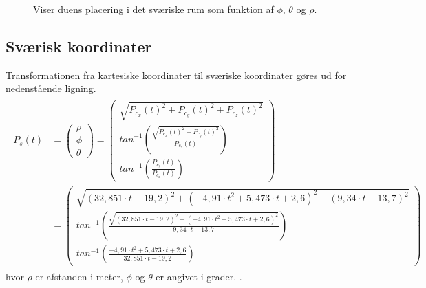 \begin{figure}[!th]
\centering
\begin{tikzpicture}[scale=4]

\end{tikzpicture}
\caption[Sværisk koordinatsystem til koordinattransformation]{Viser duens placering i det sværiske rum som funktion af  \(\phi\), \(\theta\) og \(\rho\).}
\label{fig:thetaphi_degree}
\end{figure}


\subsection{Sværisk koordinater}
Transformationen fra kartesiske koordinater til sværiske koordinater gøres ud for nedenstående ligning.
\begin{align}
\begin{split}
{ P }_{ s }\left( t \right) &=\left( \begin{matrix} \rho  \\ \phi  \\ \theta  \end{matrix} \right) =\left( \begin{matrix} \sqrt { { { P }_{ c_x }\left( t \right) }^{ 2 }+{ { P }_{ c_y }\left( t \right) }^{ 2 }+{ { P }_{ c_z }\left( t \right) }^{ 2 } }  \\ { tan }^{ -1 }\left( \frac { \sqrt { { { P }_{ c_x }\left( t \right) }^{ 2 }+{ { P }_{ c_y }\left( t \right) }^{ 2 } }  }{ { P }_{ c_z }\left( t \right) }  \right)  \\ { tan }^{ -1 }\left( \frac { { P }_{ c_y }\left( t \right) }{ { P }_{ c_x }\left( t \right) }  \right)  \end{matrix} \right) 
\\
 &=\left( \begin{matrix} \sqrt { { \left( 32,851\cdot t-19,2 \right)  }^{ 2 }+{ \left( -{ 4,91\cdot t }^{ 2 }+5,473\cdot t+2,6 \right)  }^{ 2 }+{ \left( 9,34\cdot t-13,7 \right)  }^{ 2 } }  \\ { tan }^{ -1 }\left( \frac { \sqrt { { \left( 32,851\cdot t-19,2 \right)  }^{ 2 }+{ \left( -{ 4,91\cdot t }^{ 2 }+5,473\cdot t+2,6 \right)  }^{ 2 } }  }{ 9,34\cdot t-13,7 }  \right)  \\ { tan }^{ -1 }\left( \frac { -{ 4,91\cdot t }^{ 2 }+5,473\cdot t+2,6 }{ 32,851\cdot t-19,2 }  \right)  \end{matrix} \right) 
\label{eq:sv_koordi}
\end{split}
\end{align}
hvor \(\rho\) er afstanden i meter, \(\phi\) og \(\theta\) er angivet i grader. \citep[Kap. 10.6, s. 598]{adam}.
